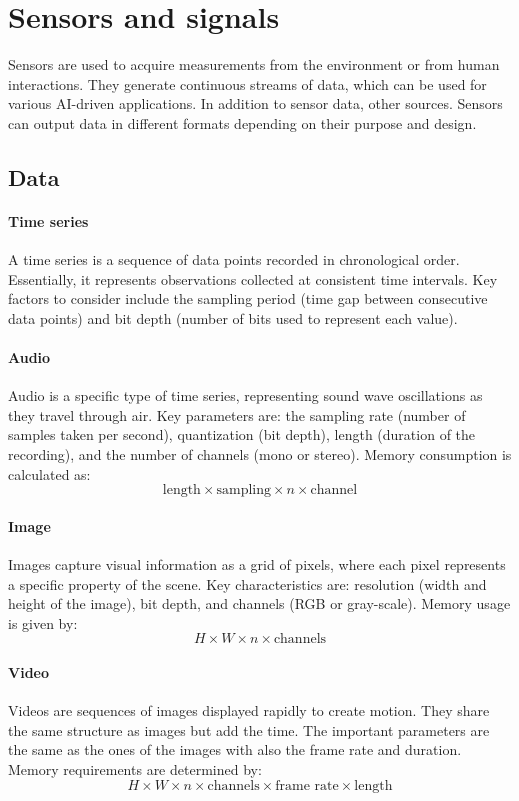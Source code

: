 \section{Sensors and signals}

Sensors are used to acquire measurements from the environment or from human interactions. 
They generate continuous streams of data, which can be used for various AI-driven applications. 
In addition to sensor data, other sources. 
Sensors can output data in different formats depending on their purpose and design.

\subsection{Data}
\paragraph*{Time series}
A time series is a sequence of data points recorded in chronological order. 
Essentially, it represents observations collected at consistent time intervals.
Key factors to consider include the sampling period (time gap between consecutive data points) and bit depth (number of bits used to represent each value).

\paragraph*{Audio}
Audio is a specific type of time series, representing sound wave oscillations as they travel through air.
Key parameters are: the sampling rate (number of samples taken per second), quantization (bit depth), length (duration of the recording), and the number of channels (mono or stereo).
Memory consumption is calculated as:
\[\text{length}\times\text{sampling}\times n \times\text{channel}\]

\paragraph*{Image}
Images capture visual information as a grid of pixels, where each pixel represents a specific property of the scene.
Key characteristics are: resolution (width and height of the image), bit depth, and channels (RGB or gray-scale).
Memory usage is given by:
\[H \times W \times n \times \text{channels}\]

\paragraph{Video}
Videos are sequences of images displayed rapidly to create motion. 
They share the same structure as images but add the time.
The important parameters are the same as the ones of the images with also the frame rate and duration. 
Memory requirements are determined by:
\[H \times W \times n \times \text{channels} \times \text{frame rate} \times \text{length}\]

